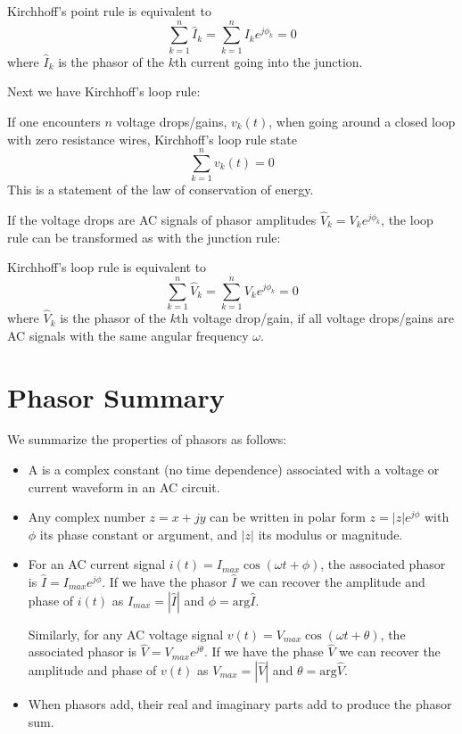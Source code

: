 \begin{thm}
    Kirchhoff's point rule is equivalent to $$\sum_{k=1}^n\hat{I}_k = \sum_{k=1}^nI_ke^{j\phi_k} = 0$$ where $\hat{I}_k$ is the phasor of the $k$th current going into the junction.
\end{thm}

\noindent Next we have Kirchhoff's loop rule:

\begin{thm}
    If one encounters $n$ voltage drops/gains, $v_k(t)$, when going around a closed loop with zero resistance wires, Kirchhoff's loop rule state $$\sum_{k=1}^nv_k(t) = 0$$ This is a statement of the law of conservation of energy.
\end{thm}

If the voltage drops are AC signals of phasor amplitudes $\hat{V}_k = V_ke^{j\phi_k}$, the loop rule can be transformed as with the junction rule:

\begin{thm}
    Kirchhoff's loop rule is equivalent to $$\sum_{k=1}^n\hat{V}_k = \sum_{k=1}^nV_ke^{j\phi_k} = 0$$ where $\hat{V}_k$ is the phasor of the $k$th voltage drop/gain, if all voltage drops/gains are AC signals with the same angular frequency $\omega$.
\end{thm}

\section{Phasor Summary}

We summarize the properties of phasors as follows: 

\begin{itemize}
    \item A  is a complex constant (no time dependence) associated with a voltage or current waveform in an AC circuit.
    \item Any complex number $z = x+jy$ can be written in polar form $z = |z|e^{j\phi}$ with $\phi$ its phase constant or argument, and $|z|$ its modulus or magnitude.
    \item For an AC current signal $i(t) = I_{max}\cos(\omega t+\phi)$, the associated phasor is $\hat{I} = I_{max}e^{j\phi}$. If we have the phasor $\hat{I}$ we can recover the amplitude and phase of $i(t)$ as $I_{max} = |\hat{I}|$ and $\phi = \text{arg}\hat{I}$.

        Similarly, for any AC voltage signal $v(t) = V_{max}\cos(\omega t+\theta)$, the associated phasor is $\hat{V} = V_{max}e^{j\theta}$. If we have the phase $\hat{V}$ we can recover the amplitude and phase of $v(t)$ as $V_{max} = |\hat{V}|$ and $\theta = \text{arg}\hat{V}$.
    \item When phasors add, their real and imaginary parts add to produce the phasor sum.
\end{itemize}

